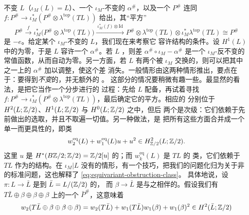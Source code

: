 不变\trLagrange\trSubmanifold{} $L$（$\iota_M(L)=L$）、一个 $\iota_M$-不变的\trGrading{}
$\alpha^{\#}$，以及一个\trPinStructure{} $P^{\#}$ 连同\trIsomorphism{} $f\colon P^{\#}\to
\iota_M^*(P^{\#}\otimes\lambda^{\mathrm{top}}(TL))$ 给出，其“平方”
\begin{equation}\label{eq:equivariant-brane-square}
P^{\#}\xrightarrow{\ f\ }\iota_M^*\bigl(P^{\#}\otimes\lambda^{\mathrm{top}}(TL)\bigr)
\xrightarrow{\ \iota_M^*(f)\otimes\mathrm{Id}\ }
P^{\#}\otimes\lambda^{\mathrm{top}}(TL)\otimes\iota_M^*\lambda^{\mathrm{top}}(TL)
\cong P^{\#}
\end{equation}
是 $-e$。给定某个 $\iota_M$-不变的\trLagrange\trSubmanifold{} $L$，我们现在来考察它%
容许\trEquivariant{}\trBrane{}结构的条件。设 $H^1(L)$ 中的\trMaslovClass{}为零，于是 $L$ 容许一个%
\trGrading{} $\alpha^{\#}$。若 $L$ \trConnected，则差 $\alpha^{\#}\circ\iota_M-\alpha^{\#}$
是一个 $\iota_M$-反不变的常值函数，从而自动为零。另一方面，若 $L$ 有两个被 $\iota_M$
交换的\trConnectedComponent，则可以把其中之一上的 $\alpha^{\#}$ 加以调整，使这个差
消失。一般情形由这两种情形推出，要点在于：要得到\emph{不变}的\trGrading，并无额外的%
\trObstruction。
\trPinStructure{}这部分的情况要稍微有趣一些。最显然的看法，是把它当作一个分步进行的
过程：先给 $L$ 配备\trPinStructure，再试着寻找\trIsomorphism{} $f\colon P^{\#}\to
\iota_M^*(P^{\#}\otimes\lambda^{\mathrm{top}}(TL))$，最后确定它的平方。相应的%
\trObstruction{}分别位于 $H^2(L;\mathbb{Z}/2)$、$H^1(L;\mathbb{Z}/2)$ 与 $H^0(L;\mathbb{Z}/2)$ 之中，但后
两个是次级\trObstruction：它们依赖于先前做出的选取，并且不取遍一切值。另一种做法，是
把所有这些方面合并成一个单一而更具\trCanonical{}性的\trObstruction，即\trEquivariant{}\trCohomology{}类
\begin{equation}\label{eq:equivariant-obstruction-class}
w^{\mathrm{eq}}_2(L)+w^{\mathrm{eq}}_1(L)u+u^2\in H^2_{\mathbb{Z}/2}(L;\mathbb{Z}/2).
\end{equation}
这里 $u$ 是 $H^*(B\mathbb{Z}/2;\mathbb{Z}/2)=\mathbb{Z}/2[u]$ 的\trGenerator；而 $w^{\mathrm{eq}}_k(L)$ 是
$TL$ 的\trEquivariant{} \trStiefelWhitney{}类，它们依赖于 $TL$ 作为\trEquivariant{}\trVectorBundle{}的结构。在
$\iota_M|L$ 没有\trFixedPoint{}的情形，有一个\trStabilization{}技巧，把我们的问题化归为关于非%
\trEquivariant{}\trPinStructure{}的标准问题，这也解释了 \eqref{eq:equivariant-obstruction-class}。
具体地说，设 $\pi\colon L\to\bar{L}$ 是到\trQuotient{} $\bar{L}=L/(\mathbb{Z}/2)$ 的\trCovering，
而 $\beta\to\bar{L}$ 是与之相伴的\trRealLineBundle。假设我们有 $T\bar{L}\oplus\beta\oplus
\beta\oplus\beta$ 上的一个\trPinStructure{} $\bar{P}^{\#}$，这意味着
\begin{equation}\label{eq:pin-quotient-criterion}
w_2(T\bar{L}\oplus\beta\oplus\beta\oplus\beta)
=w_2(T\bar{L})+w_1(T\bar{L})w_1(\beta)+w_1(\beta)^2\in H^2(\bar{L};\mathbb{Z}/2)
\end{equation}
